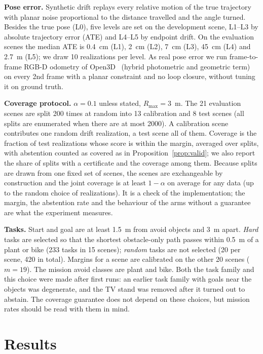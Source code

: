 \documentclass[conference]{IEEEtran}
\theoremstyle{definition}
\begin{document}
\textbf{Pose error.} Synthetic drift replays every relative motion of the true trajectory with planar noise
proportional to the distance travelled and the angle turned. Besides the true pose (L0), five levels are set on the
development scene, L1--L3 by absolute trajectory error (ATE) and L4--L5 by endpoint drift. On the evaluation scenes the
median ATE is 0.4~cm (L1), 2~cm (L2), 7~cm (L3), 45~cm (L4) and 2.7~m (L5); we draw 10 realizations per level. As real
pose error we run frame-to-frame RGB-D odometry of Open3D~\cite{open3d} (hybrid photometric and geometric term) on every 2nd frame with a planar
constraint and no loop closure, without tuning it on ground truth.

\textbf{Coverage protocol.} $\alpha = 0.1$ unless stated, $R_{\max} = 3$~m. The 21 evaluation scenes are split 200
times at random into 13 calibration and 8 test scenes (all splits are enumerated when there are at most 2000). A
calibration scene contributes one random drift realization, a test scene all of them. Coverage is the fraction of test
realizations whose score is within the margin, averaged over splits, with abstention counted as covered as in
Proposition~\ref{prop:valid}; we also report the share of splits with a certificate and the coverage among them. Because
splits are drawn from one fixed set of scenes, the scenes are exchangeable by construction and the joint coverage is at
least $1 - \alpha$ on average for any data (up to the random choice of realizations). It is a check of the implementation; the margin, the abstention rate and the behaviour of
the arms without a guarantee are what the experiment measures.

\textbf{Tasks.} Start and goal are at least 1.5~m from avoid objects and 3~m apart. \emph{Hard} tasks are selected so
that the shortest obstacle-only path passes within 0.5~m of a plant or bike (233 tasks in 15 scenes); \emph{random} tasks
are not selected (20 per scene, 420 in total). Margins for a scene are calibrated on the other 20 scenes ($m = 19$). The
mission avoid classes are plant and bike. Both the task family and this choice were made after first runs: an earlier
task family with goals near the objects was degenerate, and the TV stand was removed after it turned out to abstain. The
coverage guarantee does not depend on these choices, but mission rates should be read with them in mind.

\section{Results}
\end{document}
